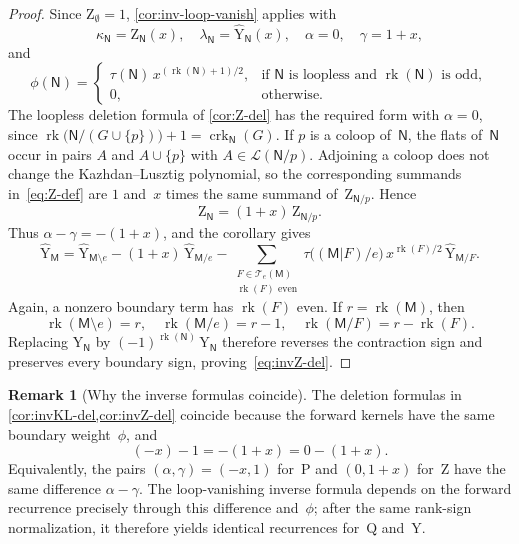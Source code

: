 \documentclass[12pt,letterpaper,english]{amsart}
\theoremstyle{teoremas}
\theoremstyle{definition}
\newtheorem{remark}[theorem]{Remark}
\DeclareMathOperator{\rk}{rk}
\DeclareMathOperator{\crk}{crk}
\newcommand{\M}{\mathsf{M}}
\newcommand{\N}{\mathsf{N}}
\newcommand{\PP}{\mathrm{P}}
\newcommand{\QQ}{\mathrm{Q}}
\newcommand{\YY}{\mathrm{Y}}
\newcommand{\ZP}{\mathrm{Z}} %
\newcommand{\Te}{\mathcal{T}_e}
\begin{document}
\begin{proof}
Since $\ZP_{\emptyset} = 1$, \cref{cor:inv-loop-vanish} applies with
\[
\kappa_{\N} = \ZP_{\N}(x),\quad
\lambda_{\N} = \hat{\YY}_{\N}(x),\quad
\alpha = 0,\quad
\gamma = 1+x,
\]
and
\[
\phi(\N) =
\begin{cases}
\tau(\N)\, x^{(\rk(\N)+1)/2},
  & \text{if $\N$ is loopless and $\rk(\N)$ is odd},\\
0, & \text{otherwise}.
\end{cases}
\]
The loopless deletion formula of \cref{cor:Z-del} has the required form
with $\alpha = 0$, since
$\rk\bigl(\N/(G \cup \{p\})\bigr) + 1 = \crk_{\N}(G)$.
If $p$ is a coloop of~$\N$, the flats of~$\N$ occur in pairs $A$
and $A \cup \{p\}$ with $A \in \mathcal{L}(\N/p)$.
Adjoining a coloop does not change the Kazhdan--Lusztig polynomial,
so the corresponding summands in~\eqref{eq:Z-def} are $1$ and~$x$
times the same summand of~$\ZP_{\N/p}$.  Hence
\[
\ZP_{\N} = (1+x)\, \ZP_{\N/p}.
\]
Thus $\alpha - \gamma = -(1+x)$, and the corollary gives
\[
\hat{\YY}_{\M} = \hat{\YY}_{\M \setminus e}
  - (1+x)\, \hat{\YY}_{\M/e}
  - \sum_{\substack{F \in \Te(\M) \\ \rk(F) \text{ even}}}
    \tau\bigl((\M|F)/e\bigr)\, x^{\rk(F)/2}\,
    \hat{\YY}_{\M/F}.
\]
Again, a nonzero boundary term has $\rk(F)$ even.
If $r = \rk(\M)$, then
\[
\rk(\M \setminus e) = r,\quad
\rk(\M/e) = r-1,\quad
\rk(\M/F) = r - \rk(F).
\]
Replacing $\hat{\YY}_{\N}$ by $(-1)^{\rk(\N)}\, \YY_{\N}$ therefore
reverses the contraction sign and preserves every boundary sign,
proving~\eqref{eq:invZ-del}.
\end{proof}

\begin{remark}[Why the inverse formulas coincide]\label{rem:inverse-coincide}
The deletion formulas in \cref{cor:invKL-del,cor:invZ-del} coincide
because the forward kernels have the same boundary weight~$\phi$, and
\[
(-x) - 1 = -(1+x) = 0 - (1+x).
\]
Equivalently, the pairs $(\alpha, \gamma) = (-x, 1)$ for~$\PP$
and $(0, 1+x)$ for~$\ZP$ have the same difference $\alpha - \gamma$.
The loop-vanishing inverse formula depends on the forward recurrence
precisely through this difference and~$\phi$; after the same rank-sign
normalization, it therefore yields identical recurrences for~$\QQ$
and~$\YY$.
\end{remark}


\end{document}
